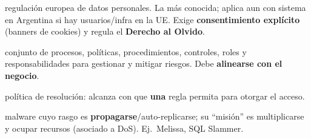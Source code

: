 \documentclass[../main.tex]{subfiles}
\begin{document}
\begin{description}[leftmargin=0pt, style=unboxed, itemsep=1pt, parsep=0pt]
  \item[\textbf{GDPR (2018)}] regulación europea de datos personales. La más conocida; aplica aun con sistema en Argentina si hay usuarios/infra en la UE. Exige \textbf{consentimiento explícito} (banners de cookies) y regula el \textbf{Derecho al Olvido}.
  \item[\textbf{Gobernanza de seguridad}] conjunto de procesos, políticas, procedimientos, controles, roles y responsabilidades para gestionar y mitigar riesgos. Debe \textbf{alinearse con el negocio}.
  \item[\textbf{Grant-all}] política de resolución: alcanza con que \textbf{una} regla permita para otorgar el acceso.
  \item[\textbf{Gusano (Worm)}] malware cuyo rasgo es \textbf{propagarse}/auto-replicarse; su ``misión'' es multiplicarse y ocupar recursos (asociado a DoS). Ej.\ Melissa, SQL Slammer.
\end{description}
\end{document}
